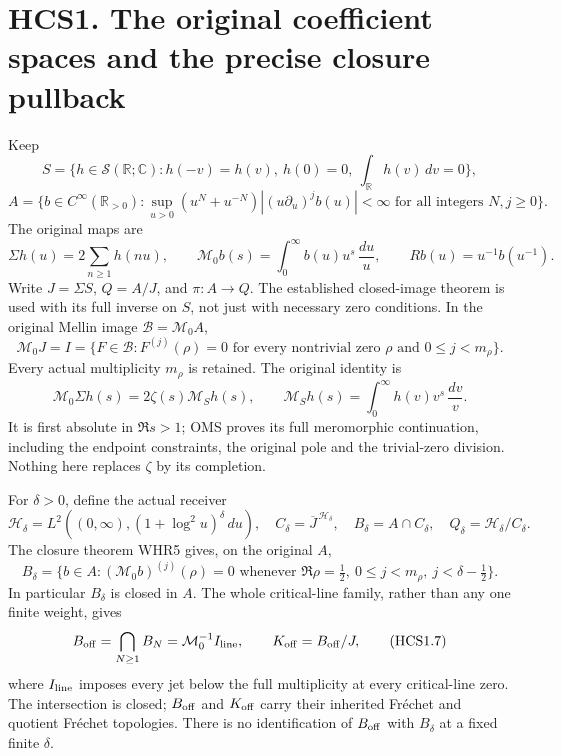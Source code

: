 \section{HCS1. The original coefficient spaces and the precise closure
pullback}\label{hcs1.-the-original-coefficient-spaces-and-the-precise-closure-pullback}

Keep \[
S=\{h\in\mathcal S(\mathbb R;\mathbb C):
h(-v)=h(v),\ h(0)=0,\ \int_{\mathbb R}h(v)\,dv=0\},
\] \[
A=\{b\in C^\infty(\mathbb R_{>0}):
\sup_{u>0}(u^N+u^{-N})|(u\partial_u)^jb(u)|<\infty
\text{ for all integers }N,j\ge0\}.
\tag{HCS1.1}
\] The original maps are \[
\Sigma h(u)=2\sum_{n\ge1}h(nu),\qquad
\mathcal M_0b(s)=\int_0^\infty b(u)u^s\,\frac{du}{u},
\qquad Rb(u)=u^{-1}b(u^{-1}).
\tag{HCS1.2}
\] Write \(J=\Sigma S\), \(Q=A/J\), and \(\pi:A\to Q\). The established
closed-image theorem is used with its full inverse on \(S\), not just
with necessary zero conditions. In the original Mellin image
\(\mathcal B=\mathcal M_0A\), \[
\mathcal M_0J=I
=\{F\in\mathcal B:F^{(j)}(\rho)=0
\text{ for every nontrivial zero }\rho
\text{ and }0\le j<m_\rho\}.
\tag{HCS1.3}
\] Every actual multiplicity \(m_\rho\) is retained. The original
identity is \[
\mathcal M_0\Sigma h(s)=2\zeta(s)\mathcal M_Sh(s),\qquad
\mathcal M_Sh(s)=\int_0^\infty h(v)v^s\,\frac{dv}{v}.
\tag{HCS1.4}
\] It is first absolute in \(\Re s>1\); OMS proves its full meromorphic
continuation, including the endpoint constraints, the original pole and
the trivial-zero division. Nothing here replaces \(\zeta\) by its
completion.

For \(\delta>0\), define the actual receiver \[
\mathcal H_\delta=L^2\!\left((0,\infty),
(1+\log^2u)^\delta\,du\right),\quad
C_\delta=\overline J^{\,\mathcal H_\delta},\quad
B_\delta=A\cap C_\delta,\quad Q_\delta=\mathcal H_\delta/C_\delta.
\tag{HCS1.5}
\] The closure theorem WHR5 gives, on the original \(A\), \[
B_\delta=\{b\in A:
(\mathcal M_0b)^{(j)}(\rho)=0
\text{ whenever }\Re\rho=\tfrac12,\
0\le j<m_\rho,\ j<\delta-\tfrac12\}.
\tag{HCS1.6}
\] In particular \(B_\delta\) is closed in \(A\). The whole
critical-line family, rather than any one finite weight, gives \[
B_{\rm off}=\bigcap_{N\ge1}B_N
=\mathcal M_0^{-1}I_{\rm line},\qquad
K_{\rm off}=B_{\rm off}/J,
\tag{HCS1.7}
\] where \(I_{\rm line}\) imposes every jet below the full multiplicity
at every critical-line zero. The intersection is closed; \(B_{\rm off}\)
and \(K_{\rm off}\) carry their inherited Fréchet and quotient Fréchet
topologies. There is no identification of \(B_{\rm off}\) with
\(B_\delta\) at a fixed finite \(\delta\).

